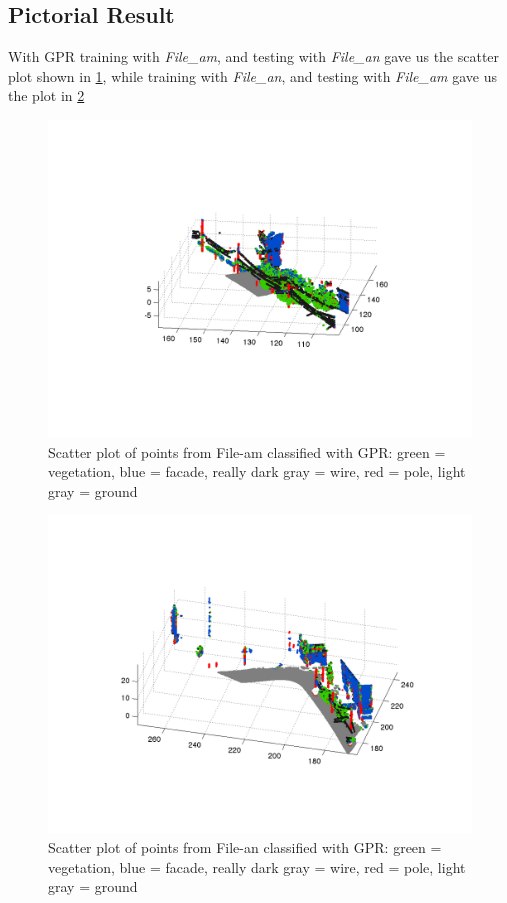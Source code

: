\documentclass[letterpaper]{article}
\begin{document}
\subsection*{Pictorial Result}
With GPR training with \textit{File\_am}, and testing with \textit{File\_an} gave us the scatter plot shown in \ref{Fig_GPR1}, while training with \textit{File\_an}, and testing with \textit{File\_am} gave us the plot in \ref{Fig_GPR2}
\begin{figure}
\includegraphics[width=.8\linewidth]{gpr_trainam_testan.png}
\caption{Scatter plot of points from File-am classified with GPR: green = vegetation, blue = facade, really dark gray = wire, red = pole, light gray = ground}
\label{Fig_GPR1}
\end{figure}
\begin{figure}
\includegraphics[width=.8\linewidth]{gpr_trainan_testam.png}
\caption{Scatter plot of points from File-an classified with GPR: green = vegetation, blue = facade, really dark gray = wire, red = pole, light gray = ground}
\label{Fig_GPR2}
\end{figure}
\end{document}
